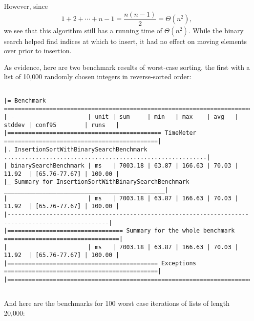 \documentclass{article}
\begin{document}
\bigskip
\bigskip

However, since
\[
	1 + 2 + \cdots + n-1 = \frac{n(n-1)}{2} = \Theta(n^2),
\]
\noindent we see that this algorithm still has a running time of $\Theta(n^2)$. While the binary search helped find indices at which to insert, it had no effect on moving elements over prior to insertion.

As evidence, here are two benchmark results of worst-case sorting, the first with a list of 10,000 randomly chosen integers in reverse-sorted order:

\begingroup
\fontsize{8pt}{8pt}\selectfont
\begin{verbatim}

|= Benchmark =======================================================================================|
| -                     | unit | sum     | min   | max    | avg   | stddev | conf95        | runs   |
|============================================ TimeMeter ============================================|
|. InsertionSortWithBinarySearchBenchmark ..........................................................|
| binarySearchBenchmark | ms   | 7003.18 | 63.87 | 166.63 | 70.03 | 11.92  | [65.76-77.67] | 100.00 |
|_ Summary for InsertionSortWithBinarySearchBenchmark ______________________________________________|
|                       | ms   | 7003.18 | 63.87 | 166.63 | 70.03 | 11.92  | [65.76-77.67] | 100.00 |
|---------------------------------------------------------------------------------------------------|
|================================= Summary for the whole benchmark =================================|
|                       | ms   | 7003.18 | 63.87 | 166.63 | 70.03 | 11.92  | [65.76-77.67] | 100.00 |
|=========================================== Exceptions ============================================|
|===================================================================================================|


\end{verbatim}
\endgroup

And here are the benchmarks for 100 worst case iterations of lists of length 20,000:
\end{document}
